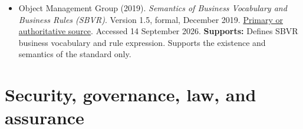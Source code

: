 \begin{itemize}
\item {}\textbf{} Object Management Group (2019). \emph{Semantics of Business Vocabulary and Business Rules (SBVR)}. Version 1.5, formal, December 2019. \href{\detokenize{https://www.omg.org/spec/SBVR/1.5}}{Primary or authoritative source}. Accessed 14 September 2026. \textbf{Supports:} Defines SBVR business vocabulary and rule expression. Supports the existence and semantics of the standard only.

\end{itemize}

\section{Security, governance, law, and assurance}

